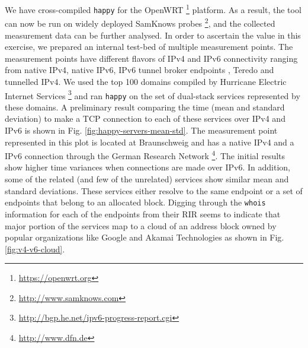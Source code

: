 We have cross-compiled \texttt{happy} for the OpenWRT
\footnote{\url{https://openwrt.org}} platform. As a result, the tool can now
be run on widely deployed SamKnows probes
\footnote{\url{http://www.samknows.com}}, and the collected measurement data
can be further analysed. In order to ascertain the value in this exercise, we
prepared an internal test-bed of multiple measurement points. The measurement
points have different flavors of IPv4 and IPv6 connectivity ranging from
native IPv4, native IPv6, IPv6 tunnel broker endpoints \cite{rfc3053}, Teredo
\cite{rfc4380} and tunnelled IPv4. We used the top 100 domains compiled by
Hurricane Electric Internet Services
\footnote{\url{http://bgp.he.net/ipv6-progress-report.cgi}} and ran
\texttt{happy} on the set of dual-stack services represented by these domains.
A preliminary result comparing the time (mean and standard deviation) to make
a TCP connection to each of these services over IPv4 and IPv6 is shown in Fig.
\ref{fig:happy-servers-mean-std}. The measurement point represented in this
plot is located at Braunschweig and has a native IPv4 and a IPv6 connection
through the German Research Network \footnote{\url{http://www.dfn.de}}. The
initial results show higher time variances when connections are made over
IPv6. In addition, some of the related (and few of the unrelated) services
show similar mean and standard deviations. These services either resolve to
the same endpoint or a set of endpoints that belong to an allocated block.
Digging through the \texttt{whois} information for each of the endpoints from
their \ac{RIR} seems to indicate that major portion of the services map to a
cloud of an address block owned by popular organizations like Google and
Akamai Technologies as shown in Fig. \ref{fig:v4-v6-cloud}.

